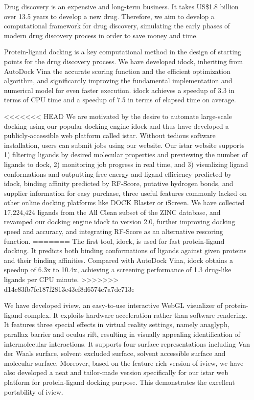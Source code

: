 Drug discovery is an expensive and long-term business. It takes US\$1.8 billion over 13.5 years to develop a new drug. Therefore, we aim to develop a computational framework for drug discovery, simulating the early phases of modern drug discovery process in order to save money and time.

Protein-ligand docking is a key computational method in the design of starting points for the drug discovery process. We have developed idock, inheriting from AutoDock Vina the accurate scoring function and the efficient optimization algorithm, and significantly improving the fundamental implementation and numerical model for even faster execution. idock achieves a speedup of 3.3 in terms of CPU time and a speedup of 7.5 in terms of elapsed time on average.

<<<<<<< HEAD
We are motivated by the desire to automate large-scale docking using our popular docking engine idock and thus have developed a publicly-accessible web platform called istar. Without tedious software installation, users can submit jobs using our website. Our istar website supports 1) filtering ligands by desired molecular properties and previewing the number of ligands to dock, 2) monitoring job progress in real time, and 3) visualizing ligand conformations and outputting free energy and ligand efficiency predicted by idock, binding affinity predicted by RF-Score, putative hydrogen bonds, and supplier information for easy purchase, three useful features commonly lacked on other online docking platforms like DOCK Blaster or iScreen. We have collected 17,224,424 ligands from the All Clean subset of the ZINC database, and revamped our docking engine idock to version 2.0, further improving docking speed and accuracy, and integrating RF-Score as an alternative rescoring function.
=======
The first tool, idock, is used for fast protein-ligand docking. It predicts both binding conformations of ligands against given proteins and their binding affinities. Compared with AutoDock Vina, idock obtains a speedup of 6.3x to 10.4x, achieving a screening performance of 1.3 drug-like ligands per CPU minute.
>>>>>>> d14c83fb7fc187f2813e43ef8d6574c7a7dc713e

We have developed iview, an easy-to-use interactive WebGL visualizer of protein-ligand complex. It exploits hardware acceleration rather than software rendering. It features three special effects in virtual reality settings, namely anaglyph, parallax barrier and oculus rift, resulting in visually appealing identification of intermolecular interactions. It supports four surface representations including Van der Waals surface, solvent excluded surface, solvent accessible surface and molecular surface. Moreover, based on the feature-rich version of iview, we have also developed a neat and tailor-made version specifically for our istar web platform for protein-ligand docking purpose. This demonstrates the excellent portability of iview.

